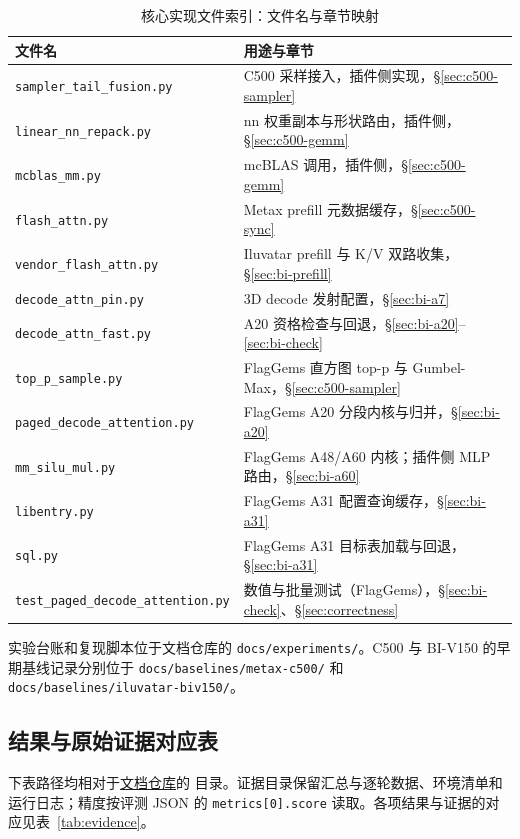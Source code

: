 \documentclass[11pt,a4paper]{ctexart}
\newcommand{\secref}[1]{\S\ref{#1}}
\begin{document}
\begin{table}[H]
\centering\footnotesize
\caption{核心实现文件索引：文件名与章节映射\label{tab:files}}
\begin{tabularx}{\linewidth}{@{}p{6cm}>{\raggedright\arraybackslash}X@{}}
\toprule
文件名 & 用途与章节 \\
\midrule
\texttt{sampler\_tail\_fusion.py} & C500 采样接入，插件侧实现，\secref{sec:c500-sampler} \\
\texttt{linear\_nn\_repack.py} & nn 权重副本与形状路由，插件侧，\secref{sec:c500-gemm} \\
\texttt{mcblas\_mm.py} & mcBLAS 调用，插件侧，\secref{sec:c500-gemm} \\
\texttt{flash\_attn.py} & Metax prefill 元数据缓存，\secref{sec:c500-sync} \\
\texttt{vendor\_flash\_attn.py} & Iluvatar prefill 与 K/V 双路收集，\secref{sec:bi-prefill} \\
\texttt{decode\_attn\_pin.py} & 3D decode 发射配置，\secref{sec:bi-a7} \\
\texttt{decode\_attn\_fast.py} & A20 资格检查与回退，\mbox{\secref{sec:bi-a20}–\ref{sec:bi-check}} \\
\texttt{top\_p\_sample.py} & FlagGems 直方图 top-p 与 Gumbel-Max，\secref{sec:c500-sampler} \\
\texttt{paged\_decode\_attention.py} & FlagGems A20 分段内核与归并，\secref{sec:bi-a20} \\
\texttt{mm\_silu\_mul.py} & FlagGems A48/A60 内核；插件侧 MLP 路由，\secref{sec:bi-a60} \\
\texttt{libentry.py} & FlagGems A31 配置查询缓存，\secref{sec:bi-a31} \\
\texttt{sql.py} & FlagGems A31 目标表加载与回退，\secref{sec:bi-a31} \\
\texttt{test\_paged\_decode\_attention.py} & 数值与批量测试（FlagGems），\secref{sec:bi-check}、\secref{sec:correctness} \\
\bottomrule
\end{tabularx}
\end{table}

实验台账和复现脚本位于文档仓库的 \texttt{docs/experiments/}。C500 与 BI-V150 的早期基线记录分别位于 \texttt{docs/baselines/metax-c500/} 和 \texttt{docs/baselines/iluvatar-biv150/}。

\subsection{结果与原始证据对应表}
下表路径均相对于\href{https://github.com/xy200303/minicpm-flagserve}{文档仓库}的  目录。证据目录保留汇总与逐轮数据、环境清单和运行日志；精度按评测 JSON 的 \texttt{metrics[0].score} 读取。各项结果与证据的对应见表~\ref{tab:evidence}。
\end{document}
